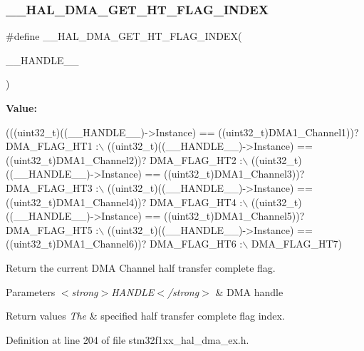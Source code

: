 \subsubsection{\texorpdfstring{\+\_\+\+\_\+\+H\+A\+L\+\_\+\+D\+M\+A\+\_\+\+G\+E\+T\+\_\+\+H\+T\+\_\+\+F\+L\+A\+G\+\_\+\+I\+N\+D\+EX}{\_\_HAL\_DMA\_GET\_HT\_FLAG\_INDEX}}
{\footnotesize\ttfamily \#define \+\_\+\+\_\+\+H\+A\+L\+\_\+\+D\+M\+A\+\_\+\+G\+E\+T\+\_\+\+H\+T\+\_\+\+F\+L\+A\+G\+\_\+\+I\+N\+D\+EX(\begin{DoxyParamCaption}\item[{}]{\+\_\+\+\_\+\+H\+A\+N\+D\+L\+E\+\_\+\+\_\+ }\end{DoxyParamCaption})}

{\bfseries Value\+:}
\begin{DoxyCode}
(((uint32\_t)((\_\_HANDLE\_\_)->Instance) == ((uint32\_t)DMA1\_Channel1))? DMA\_FLAG\_HT1 :\(\backslash\)
 ((uint32\_t)((\_\_HANDLE\_\_)->Instance) == ((uint32\_t)DMA1\_Channel2))? DMA\_FLAG\_HT2 :\(\backslash\)
 ((uint32\_t)((\_\_HANDLE\_\_)->Instance) == ((uint32\_t)DMA1\_Channel3))? DMA\_FLAG\_HT3 :\(\backslash\)
 ((uint32\_t)((\_\_HANDLE\_\_)->Instance) == ((uint32\_t)DMA1\_Channel4))? DMA\_FLAG\_HT4 :\(\backslash\)
 ((uint32\_t)((\_\_HANDLE\_\_)->Instance) == ((uint32\_t)DMA1\_Channel5))? DMA\_FLAG\_HT5 :\(\backslash\)
 ((uint32\_t)((\_\_HANDLE\_\_)->Instance) == ((uint32\_t)DMA1\_Channel6))? DMA\_FLAG\_HT6 :\(\backslash\)
   DMA\_FLAG\_HT7)
\end{DoxyCode}


Return the current D\+MA Channel half transfer complete flag. 


\begin{DoxyParams}{Parameters}
{\em $<$strong$>$\+H\+A\+N\+D\+L\+E$<$/strong$>$} & D\+MA handle \\
\hline
\end{DoxyParams}

\begin{DoxyRetVals}{Return values}
{\em The} & specified half transfer complete flag index. \\
\hline
\end{DoxyRetVals}


Definition at line 204 of file stm32f1xx\+\_\+hal\+\_\+dma\+\_\+ex.\+h.

\mbox{\label{group___d_m_a___low__density___medium__density___product__devices_gae3feef5ea50ff13a6a5b98cb353c87b0}} 
